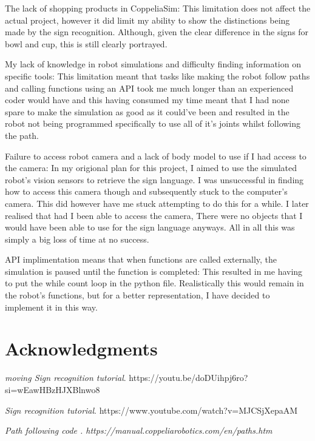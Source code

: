 \documentclass[lettersize,journal]{IEEEtran}
\begin{document}
\begin{list}{}{}
\item{The lack of shopping products in CoppeliaSim: This limitation does not affect the actual project, however it did limit my ability to show the distinctions being made by the sign recognition. Although, given the clear difference in the signs for bowl and cup, this is still clearly portrayed.}
	
\item{My lack of knowledge in robot simulations and difficulty finding information on specific tools: This limitation meant that tasks like making the robot follow paths and calling functions using an API took me much longer than an experienced coder would have and this having consumed my time meant that I had none spare to make the simulation as good as it could've been and resulted in the robot not being programmed specifically to use all of it's joints whilst following the path. }
\item{Failure to access robot camera and a  lack of body model to use if I had access to the camera: In my origional plan for this project, I aimed to use the simulated robot's vision sensors to retrieve the sign language. I was unsuccessful in finding how to access this camera though and subsequently stuck to the computer's camera. This did however have me stuck attempting to do this for a while. I later realised that had I been able to access the camera, There were no objects that I would have been able to use for the sign language anyways. All in all this was simply  a big loss of time at no success.  }
\item{API implimentation means that when functions are called externally, the simulation is paused until the function is completed: This resulted in me having to put the while count loop in the python file. Realistically this would remain in the robot's functions, but for a better representation, I have decided to implement it in this way.   }


\end{list}


\section*{Acknowledgments}

\begin{list}{}{}
\item{{\it{moving Sign recognition tutorial}}. https://youtu.be/doDUihpj6ro?si=wEawHBzHJXBlnwo8}
\item{{\it{ Sign recognition tutorial}}. https://www.youtube.com/watch?v=MJCSjXepaAM}
\item{\it{ Path following code }. https://manual.coppeliarobotics.com/en/paths.htm}
\end{list}
\end{document}
